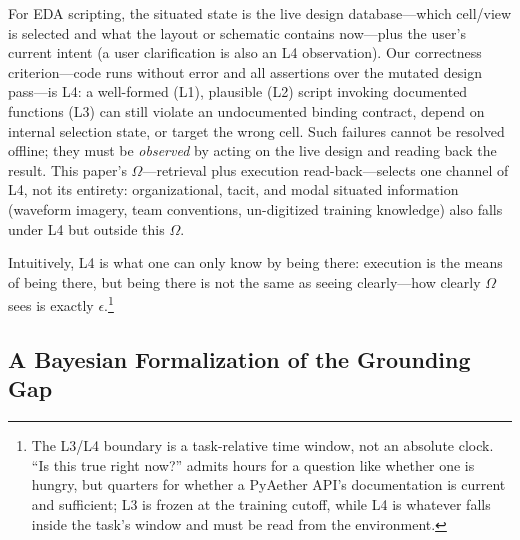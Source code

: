 For EDA scripting, the situated state is the live design database---which cell/view is selected and what the layout or schematic contains now---plus the user's current intent (a user clarification is also an L4 observation). Our correctness criterion---code runs without error and all assertions over the mutated design pass---is L4: a well-formed (L1), plausible (L2) script invoking documented functions (L3) can still violate an undocumented binding contract, depend on internal selection state, or target the wrong cell. Such failures cannot be resolved offline; they must be \emph{observed} by acting on the live design and reading back the result. This paper's $\Omega$---retrieval plus execution read-back---selects one channel of L4, not its entirety: organizational, tacit, and modal situated information (waveform imagery, team conventions, un-digitized training knowledge) also falls under L4 but outside this $\Omega$.

Intuitively, L4 is what one can only know by being there: execution is the means of being there, but being there is not the same as seeing clearly---how clearly $\Omega$ sees is exactly $\epsilon$.\footnote{The L3/L4 boundary is a task-relative time window, not an absolute clock. ``Is this true right now?'' admits hours for a question like whether one is hungry, but quarters for whether a PyAether API's documentation is current and sufficient; L3 is frozen at the training cutoff, while L4 is whatever falls inside the task's window and must be read from the environment.}

\subsection{A Bayesian Formalization of the Grounding Gap}
\label{sec:bayesian}

